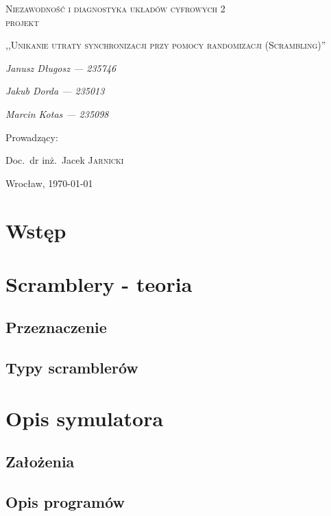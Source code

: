 \documentclass[polish, 11pt]{article}
\begin{document}
\begin{titlepage}
    \centering
    {\scshape\LARGE Niezawodność i diagnostyka układów cyfrowych 2\\ projekt \par}
    \vspace{1cm}
    {\scshape\Large,,Unikanie utraty synchronizacji przy pomocy randomizacji (Scrambling)''\par}
    \vspace{2cm}
    {\itshape\Large Janusz Długosz --- 235746\/\par}
    {\itshape\Large Jakub Dorda --- 235013\/\par}
    {\itshape\Large Marcin Kotas --- 235098\/\par}
    \vfill
    Prowadzący:\par
    Doc.~dr inż.~Jacek \textsc{Jarnicki}

    \vfill

    {\large Wrocław, \today\par}

\end{titlepage}

\section{Wstęp}

\section{Scramblery - teoria}
    \subsection{Przeznaczenie}

    \subsection{Typy scramblerów}

\section{Opis symulatora}
    \subsection{Założenia}

    \subsection{Opis programów}
\end{document}
